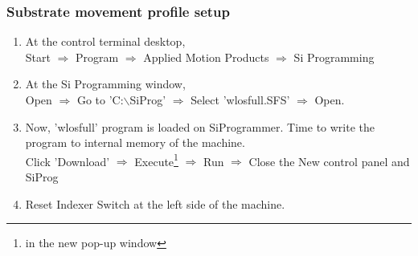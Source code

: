 \subsubsection{Substrate movement profile setup}
\begin{enumerate}
\item At the control terminal desktop,  \\ %
  Start $\Rightarrow$ Program $\Rightarrow$ %
  Applied Motion Products $\Rightarrow$ %
  Si Programming
\item At the Si Programming window, \\ %
  Open $\Rightarrow$ Go to 'C:$\backslash$SiProg' $\Rightarrow$ Select 'wlosfull.SFS'%
  $\Rightarrow$ Open.
\item Now, 'wlosfull' program is loaded on SiProgrammer. Time to write the program to internal memory of the machine. \\
  Click 'Download' $\Rightarrow$ Execute\footnote{in the new pop-up window} %
  $\Rightarrow$ Run $\Rightarrow$	Close the New control panel and SiProg
\item Reset Indexer Switch at the left side of the machine. 
\end{enumerate}

